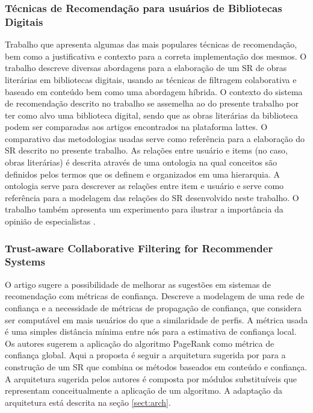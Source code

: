\documentclass[12pt]{article}
\begin{document}
\subsubsection{Técnicas de Recomendação para usuários de Bibliotecas
Digitais}

Trabalho que apresenta algumas das mais populares técnicas de recomendação, bem como a justificativa e contexto para a 
correta implementação dos mesmos. O trabalho descreve diversas abordagens para a elaboração de um SR de obras literárias 
em bibliotecas digitais, usando as técnicas de filtragem colaborativa e baseado em conteúdo bem como uma abordagem híbrida. 
O contexto do sistema de recomendação descrito no trabalho se assemelha ao do presente trabalho por ter como alvo uma 
biblioteca digital, sendo que as obras literárias da biblioteca podem ser comparadas aos artigos encontrados na plataforma 
lattes. O comparativo das metodologias usadas serve como referência para a elaboração do SR descrito no presente trabalho. 
As relações entre usuário e items (no caso, obras literárias) é descrita através de uma ontologia na qual conceitos são 
definidos pelos termos que os definem e organizados em uma hierarquia. A ontologia serve para descrever as relações entre 
item e usuário e serve como referência para a modelagem das relações do SR desenvolvido neste trabalho. O trabalho também 
apresenta um experimento para ilustrar a importância da opinião de especialistas \cite{primo2006tecnicas}.

\subsubsection{Trust-aware Collaborative Filtering for Recommender Systems}

O artigo sugere a possibilidade de melhorar as sugestões em sistemas de recomendação com métricas de confiança. Descreve a 
modelagem de uma rede de confiança e a necessidade de métricas de propagação de confiança, que considera ser computável em 
mais usuários do que a similaridade de perfis. A métrica usada é uma simples distância mínima entre nós para a estimativa de 
confiança local. Os autores sugerem a aplicação do algoritmo PageRank \cite{page1999pagerank} como métrica de confiança global. Aqui a 
proposta é seguir a arquitetura sugerida por \cite{massa2004trust} para a construção de um SR que combina os métodos baseados em 
conteúdo e confiança. A arquitetura sugerida pelos autores é composta por módulos substituíveis que representam conceitualmente 
a aplicação de um algoritmo. A adaptação da arquitetura está descrita na seção \ref{sect:arch}.
\end{document}
